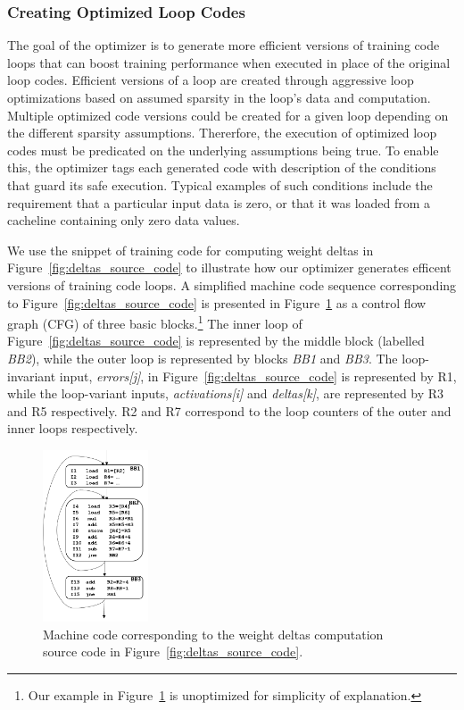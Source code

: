 \subsubsection{Creating Optimized Loop Codes}
The goal of the optimizer is to generate more efficient versions of training code loops that can boost training performance when executed in place of the original loop codes.  Efficient versions of a loop are created through aggressive loop optimizations based on assumed sparsity in the  loop's data and computation. Multiple optimized code versions could be created for a given loop depending on the different sparsity assumptions.  Thererfore, the execution of optimized loop codes must be predicated on the underlying assumptions being true.  To enable this, the optimizer tags each generated code with description of the conditions that guard its safe execution.  Typical examples of such conditions include the requirement that a particular input data is zero, or that it was loaded from a cacheline containing only zero data values. 

We use the snippet of training code for computing weight deltas in Figure~\ref{fig:deltas_source_code} to illustrate how our optimizer generates efficent versions of training code loops.   A simplified machine code sequence corresponding to  Figure~\ref{fig:deltas_source_code}  is presented in Figure~\ref{fig:deltas_machine_code} as a control flow graph (CFG) of three basic blocks.\footnote{Our example in Figure~\ref{fig:deltas_machine_code} is unoptimized for simplicity of explanation.}  The inner loop of Figure~\ref{fig:deltas_source_code} is represented by the middle block (labelled {\it BB2}), while the outer loop is represented by blocks {\it BB1} and {\it BB3}.  The loop-invariant input, {\it errors[j]}, in Figure~\ref{fig:deltas_source_code} is represented by R1, while the loop-variant inputs, {\it activations[i]} and {\it deltas[k]}, are represented by R3 and R5 respectively. R2 and R7 correspond to the loop counters of the outer and inner loops respectively. 

\begin{figure}[h]
\centering
\includegraphics[height=2in]{Figures/weight-delta-code.png}
\caption{Machine code corresponding to the weight deltas computation source code in Figure~\ref{fig:deltas_source_code}.}
\label{fig:deltas_machine_code}
\end{figure}

